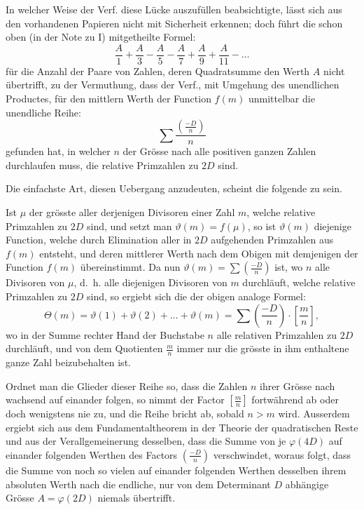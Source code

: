 \documentclass[12pt,a4paper]{article}
\begin{document}
In welcher Weise der Verf. diese Lücke auszufüllen beabsichtigte, lässt sich aus den vorhandenen Papieren
nicht mit Sicherheit erkennen; doch führt die schon oben (in der Note zu I) mitgetheilte Formel:
\[
\frac{A}{1} + \frac{A}{3} - \frac{A}{5} - \frac{A}{7} + \frac{A}{9} + \frac{A}{11} - \ldots
\]
für die Anzahl der Paare von Zahlen, deren Quadratsumme den Werth $A$ nicht übertrifft, zu der Vermuthung,
dass der Verf., mit Umgehung des unendlichen Productes, für den mittlern Werth der Function $f(m)$
unmittelbar die unendliche Reihe:
\[
\sum \frac{\left(\frac{-D}{n}\right)}{n}
\]
gefunden hat, in welcher $n$ der Grösse nach alle positiven ganzen Zahlen durchlaufen muss, die relative
Primzahlen zu $2D$ sind.

Die einfachste Art, diesen Uebergang anzudeuten, scheint die folgende zu sein.

Ist $\mu$ der grösste aller derjenigen Divisoren einer Zahl $m$, welche relative Primzahlen zu $2D$ sind,
und setzt man $\vartheta(m) = f(\mu)$, so ist $\vartheta(m)$ diejenige Function, welche durch Elimination aller
in $2D$ aufgehenden Primzahlen aus $f(m)$ entsteht, und deren mittlerer Werth nach dem Obigen mit demjenigen
der Function $f(m)$ übereinstimmt. Da nun $\vartheta(m) = \sum \left(\frac{-D}{n}\right)$ ist, wo $n$ alle Divisoren von
$\mu$, d.~h. alle diejenigen Divisoren von $m$ durchläuft, welche relative Primzahlen zu $2D$ sind, so ergiebt
sich die der obigen analoge Formel:
\[
\Theta(m) = \vartheta(1) + \vartheta(2) + \ldots + \vartheta(m) = \sum \left(\frac{-D}{n}\right) \cdot \left[\frac{m}{n}\right],
\]
wo in der Summe rechter Hand der Buchstabe $n$ alle relativen Primzahlen zu $2D$ durchläuft, und von
dem Quotienten $\frac{m}{n}$ immer nur die grösste in ihm enthaltene ganze Zahl beizubehalten ist.

Ordnet man die Glieder dieser Reihe so, dass die Zahlen $n$ ihrer Grösse nach wachsend auf einander
folgen, so nimmt der Factor $\left[\frac{m}{n}\right]$ fortwährend ab oder doch wenigstens nie zu, und die Reihe bricht ab,
sobald $n > m$ wird. Ausserdem ergiebt sich aus dem Fundamentaltheorem in der Theorie der quadratischen
Reste und aus der Verallgemeinerung desselben, dass die Summe von je $\varphi(4D)$ auf einander folgenden
Werthen des Factors $\left(\frac{-D}{n}\right)$ verschwindet, woraus folgt, dass die Summe von noch so vielen auf einander
folgenden Werthen desselben ihrem absoluten Werth nach die endliche, nur von dem Determinant $D$
abhängige Grösse $A = \varphi(2D)$ niemals übertrifft.
\end{document}
